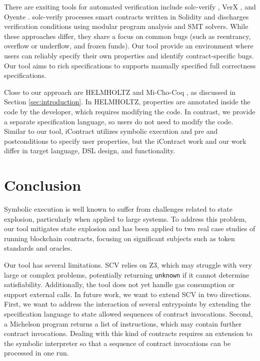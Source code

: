 \documentclass[runningheads]{llncs}
\begin{document}
There are exsiting tools for automated verification include solc-verify \cite{solc}, VerX \cite{verx}, and Oyente \cite{oyente}. solc-verify processes smart contracts written in Solidity and discharges verification conditions using modular program analysis and SMT solvers.
While these approaches differ, they share a focus on common bugs (such as reentrancy, overflow or underflow, and frozen funds). Our tool provide an environment where users can reliably specify their own properties and identify contract-specific bugs. Our tool aims to rich specifications to supports manually specified full correctness specifications.

Close to our approach are HELMHOLTZ \cite{helmholtz} and Mi-Cho-Coq \cite{micho}, as discussed in Section \ref{sec:introduction}. In HELMHOLTZ, properties are annotated inside the code by the developer, which requires modifying the code. In contrast, we provide a separate specification language, so users do not need to modify the code. Similar to our tool, iContract \cite{icontract} utilizes symbolic execution and pre and postconditions to specify user properties, but the iContract work and our work differ in target language, DSL design, and functionality.
\section{Conclusion}
\label{sec:concl-sect-append}
Symbolic execution is well known to suffer from challenges related to state explosion, particularly when applied to large systems. To address this problem, our tool mitigates state explosion and has been applied to two real case studies of running blockchain contracts, focusing on significant subjects such as token standards and oracles.

Our tool has several limitations. SCV relies on Z3, which may struggle with very large or complex problems, potentially returning \texttt{unknown} if it cannot determine satisfiability. Additionally, the tool does not yet handle gas consumption or support external calls.
In future work, we want to extend SCV in two directions. 
First, we want to address the interaction of several entrypoints by
extending the specification language to state allowed sequences of
contract invocations.  Second, a Michelson program returns a list of instructions, which may contain
further contract invocations. Dealing with this kind of contracts
requires an extension to the symbolic interpreter so that a sequence
of contract invocations can be processed in one run.
\newpage


%
\end{document}
